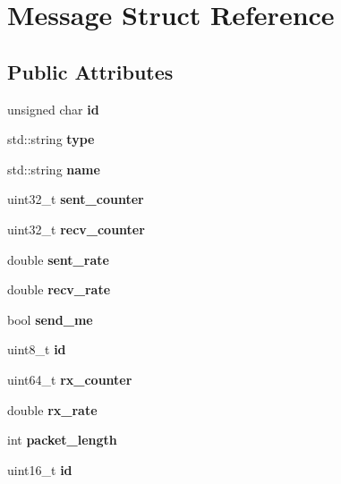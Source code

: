 \hypertarget{structMessage}{}\section{Message Struct Reference}
\label{structMessage}
\subsection*{Public Attributes}
\begin{DoxyCompactItemize}
\item 
\mbox{\label{structMessage_ab16c46ea6cb9d7ddca1c09b51f6f819a}} 
unsigned char {\bfseries id}
\item 
\mbox{\label{structMessage_ae9dead264183a4243c120026e6259b6f}} 
std\+::string {\bfseries type}
\item 
\mbox{\label{structMessage_ac7adddb666acdc47c48f684bd6810a51}} 
std\+::string {\bfseries name}
\item 
\mbox{\label{structMessage_a68489507f638f070843bf095dc8a865a}} 
uint32\+\_\+t {\bfseries sent\+\_\+counter}
\item 
\mbox{\label{structMessage_adcaaf9a8cf5dffacdda27b36746de64b}} 
uint32\+\_\+t {\bfseries recv\+\_\+counter}
\item 
\mbox{\label{structMessage_aaf0985d18299773910da56ee89564eb6}} 
double {\bfseries sent\+\_\+rate}
\item 
\mbox{\label{structMessage_a6949027e681154755f62b97783421d85}} 
double {\bfseries recv\+\_\+rate}
\item 
\mbox{\label{structMessage_aead2503e58ca595ebc5cb46da55d8c13}} 
bool {\bfseries send\+\_\+me}
\item 
\mbox{\label{structMessage_ae61f86cd0691a3f02faa414da330a780}} 
uint8\+\_\+t {\bfseries id}
\item 
\mbox{\label{structMessage_aa2358e32c398d4c8d04050415de51d3a}} 
uint64\+\_\+t {\bfseries rx\+\_\+counter}
\item 
\mbox{\label{structMessage_ae8a18093776a3a616616a8bcbda14762}} 
double {\bfseries rx\+\_\+rate}
\item 
\mbox{\label{structMessage_a182bfbe67f9cc2db232ee0a431229b5a}} 
int {\bfseries packet\+\_\+length}
\item 
\mbox{\label{structMessage_a15305fb42d930db0f522ece994b59b43}} 
uint16\+\_\+t {\bfseries id}
\end{DoxyCompactItemize}



